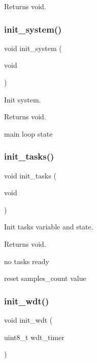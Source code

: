 \begin{DoxyReturn}{Returns}
void. 
\end{DoxyReturn}
\mbox{\label{i2c-rain_8h_a348d23d5899ce59d18975284dfb0afc0}} 
\subsubsection{\texorpdfstring{init\+\_\+system()}{init\_system()}}
{\footnotesize\ttfamily void init\+\_\+system (\begin{DoxyParamCaption}\item[{void}]{ }\end{DoxyParamCaption})}



Init system. 

\begin{DoxyReturn}{Returns}
void. 
\end{DoxyReturn}
main loop state \mbox{\label{i2c-rain_8h_a2aae2290a141fddcea3fb6009acbb445}} 
\subsubsection{\texorpdfstring{init\+\_\+tasks()}{init\_tasks()}}
{\footnotesize\ttfamily void init\+\_\+tasks (\begin{DoxyParamCaption}\item[{void}]{ }\end{DoxyParamCaption})}



Init tasks variable and state. 

\begin{DoxyReturn}{Returns}
void. 
\end{DoxyReturn}
no tasks ready

reset samples\+\_\+count value \mbox{\label{i2c-rain_8h_a980e73df66b14b1190bc25da430a4f12}} 
\subsubsection{\texorpdfstring{init\+\_\+wdt()}{init\_wdt()}}
{\footnotesize\ttfamily void init\+\_\+wdt (\begin{DoxyParamCaption}\item[{uint8\+\_\+t}]{wdt\+\_\+timer }\end{DoxyParamCaption})}



